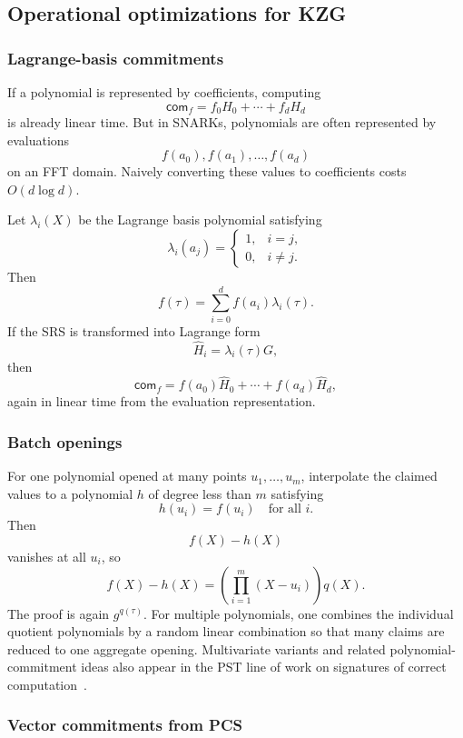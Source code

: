 \subsection{Operational optimizations for KZG}

\subsubsection{Lagrange-basis commitments}

If a polynomial is represented by coefficients, computing
\[
    \mathsf{com}_f=f_0H_0+\cdots+f_dH_d
\]
is already linear time. But in SNARKs, polynomials are often represented by evaluations
\[
    f(a_0),f(a_1),\ldots,f(a_d)
\]
on an FFT domain. Naively converting these values to coefficients costs $O(d\log d)$.

Let $\lambda_i(X)$ be the Lagrange basis polynomial satisfying
\[
    \lambda_i(a_j)=
    \begin{cases}
    1,&i=j,\\
    0,&i\neq j.
    \end{cases}
\]
Then
\[
    f(\tau)=\sum_{i=0}^{d} f(a_i)\lambda_i(\tau).
\]
If the SRS is transformed into Lagrange form
\[
    \widehat H_i=\lambda_i(\tau)G,
\]
then
\[
    \mathsf{com}_f=f(a_0)\widehat H_0+\cdots+f(a_d)\widehat H_d,
\]
again in linear time from the evaluation representation.

\subsubsection{Batch openings}

For one polynomial opened at many points $u_1,\ldots,u_m$, interpolate the claimed values to a polynomial $h$ of degree less than $m$ satisfying
\[
    h(u_i)=f(u_i)\quad\text{for all }i.
\]
Then
\[
    f(X)-h(X)
\]
vanishes at all $u_i$, so
\[
    f(X)-h(X)=\left(\prod_{i=1}^{m}(X-u_i)\right)q(X).
\]
The proof is again $g^{q(\tau)}$. For multiple polynomials, one combines the individual quotient polynomials by a random linear combination so that many claims are reduced to one aggregate opening. Multivariate variants and related polynomial-commitment ideas also appear in the PST line of work on signatures of correct computation~\cite{PapamanthouShiTamassia2013}.

\subsubsection{Vector commitments from PCS}

